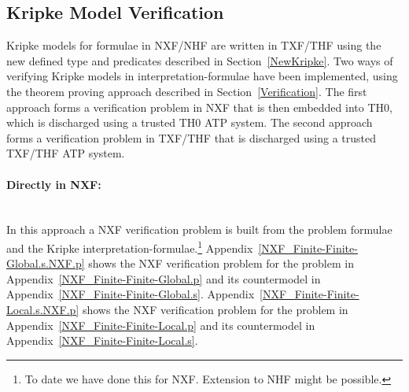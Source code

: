 \documentclass{easychair}
\begin{document}
\subsection{Kripke Model Verification}
\label{KripkeVerification}

Kripke models for formulae in NXF/NHF are written in TXF/THF using the new defined type and
predicates described in Section~\ref{NewKripke}.
Two ways of verifying Kripke models in interpretation-formulae have been implemented, using the 
theorem proving approach described in Section~\ref{Verification}.
The first approach forms a verification problem in NXF that is then embedded into TH0, which is
discharged using a trusted TH0 ATP system.
The second approach forms a verification problem in TXF/THF that is discharged using a trusted 
TXF/THF ATP system.

\paragraph{Directly in NXF:}~\\
In this approach a NXF verification problem is built from the problem formulae and the Kripke 
interpretation-formulae.\footnote{%
To date we have done this for NXF. Extension to NHF might be possible.}
Appendix~\ref{NXF_Finite-Finite-Global.s.NXF.p} shows the NXF verification problem for the problem
in Appendix~\ref{NXF_Finite-Finite-Global.p} and its countermodel in
Appendix~\ref{NXF_Finite-Finite-Global.s}.
Appendix~\ref{NXF_Finite-Finite-Local.s.NXF.p} shows the NXF verification problem for the problem
in Appendix~\ref{NXF_Finite-Finite-Local.p} and its countermodel in
Appendix~\ref{NXF_Finite-Finite-Local.s}.
\end{document}
